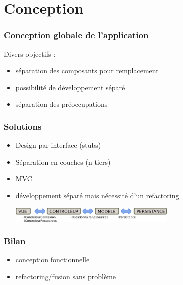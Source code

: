 \section{Conception}

\begin{frame}
\frametitle{Conception globale de l'application}
Divers objectifs :
\begin{itemize}
\item s\'eparation des composants pour remplacement
\item possibilit\'e de d\'eveloppement s\'epar\'e
\item s\'eparation des pr\'eoccupations
\end{itemize}
\end{frame}

\begin{frame}
\frametitle{Solutions}
\begin{itemize}
\item Design par interface (stubs)
\item S\'eparation en couches (n-tiers)
\item MVC
\item d\'eveloppement s\'epar\'e mais n\'ecessit\'e d'un refactoring

\includegraphics[width=8cm]{images/mvc_tiers}
\end{itemize}
\end{frame}

\begin{frame}
\frametitle{Bilan}
\begin{itemize}
\item conception fonctionnelle
\item refactoring/fusion sans probl\`eme
\end{itemize}
\end{frame}
